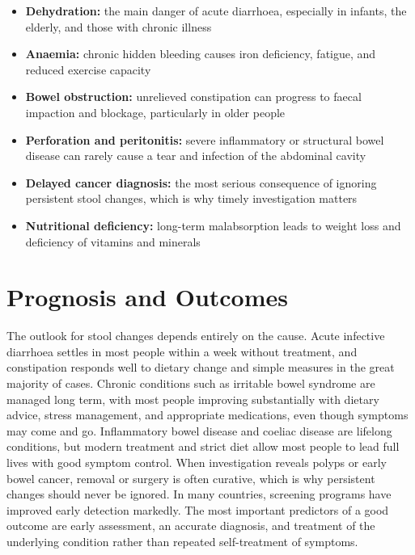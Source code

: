 \begin{itemize}
    \item \textbf{Dehydration:} the main danger of acute diarrhoea, especially in infants, the elderly, and those with chronic illness
    \item \textbf{Anaemia:} chronic hidden bleeding causes iron deficiency, fatigue, and reduced exercise capacity
    \item \textbf{Bowel obstruction:} unrelieved constipation can progress to faecal impaction and blockage, particularly in older people
    \item \textbf{Perforation and peritonitis:} severe inflammatory or structural bowel disease can rarely cause a tear and infection of the abdominal cavity
    \item \textbf{Delayed cancer diagnosis:} the most serious consequence of ignoring persistent stool changes, which is why timely investigation matters
    \item \textbf{Nutritional deficiency:} long-term malabsorption leads to weight loss and deficiency of vitamins and minerals
\end{itemize}

\section*{Prognosis and Outcomes}
The outlook for stool changes depends entirely on the cause. Acute infective diarrhoea settles in most people within a week without treatment, and constipation responds well to dietary change and simple measures in the great majority of cases. Chronic conditions such as irritable bowel syndrome are managed long term, with most people improving substantially with dietary advice, stress management, and appropriate medications, even though symptoms may come and go. Inflammatory bowel disease and coeliac disease are lifelong conditions, but modern treatment and strict diet allow most people to lead full lives with good symptom control. When investigation reveals polyps or early bowel cancer, removal or surgery is often curative, which is why persistent changes should never be ignored. In many countries, screening programs have improved early detection markedly. The most important predictors of a good outcome are early assessment, an accurate diagnosis, and treatment of the underlying condition rather than repeated self-treatment of symptoms.

